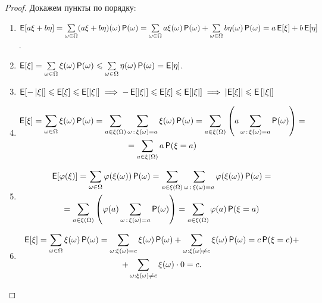 \begin{proof}
    Докажем пункты по порядку:
    \begin{enumerate}
        \item \(\operatorname{\mathsf{E}}[a\xi + b\eta] = \sum\limits_{\omega \in \Omega} (a\xi+b\eta)(\omega) \operatorname{\mathsf{P}}(\omega) =
        \sum\limits_{\omega \in \Omega} a\xi(\omega) \operatorname{\mathsf{P}}(\omega) + \sum\limits_{\omega \in \Omega}b\eta(\omega) \operatorname{\mathsf{P}}(\omega) = a\operatorname{\mathsf{E}}[\xi] + b\operatorname{\mathsf{E}}[\eta]\).
        \item \(\operatorname{\mathsf{E}}[\xi] = \sum\limits_{\omega \in \Omega} \xi(\omega)\operatorname{\mathsf{P}}(\omega) \leqslant \sum\limits_{\omega \in \Omega} \eta(\omega)\operatorname{\mathsf{P}}(\omega) = \operatorname{\mathsf{E}}[\eta]\).
        \item \(\operatorname{\mathsf{E}}[-\left|\xi\right|] \leqslant \operatorname{\mathsf{E}}[\xi] \leqslant \operatorname{\mathsf{E}}[\left|\xi\right|] \implies -\operatorname{\mathsf{E}}[\left|\xi\right|] \leqslant \operatorname{\mathsf{E}}[\xi] \leqslant \operatorname{\mathsf{E}}[\left|\xi\right|] \implies \left|\operatorname{\mathsf{E}}[\xi]\right| \leqslant \operatorname{\mathsf{E}}\left[|\xi\right|]\)
        \item
        \begin{multline*}
            \operatorname{\mathsf{E}}[\xi] =
            \sum\limits_{\omega \in \Omega} \xi(\omega)\operatorname{\mathsf{P}}(\omega) =
            \sum\limits_{a \in \xi(\Omega)}\sum\limits_{\omega\,:\,\xi(\omega) = a} \xi(\omega)\operatorname{\mathsf{P}}(\omega) =
            \sum\limits_{a \in \xi(\Omega)} \left(a\sum\limits_{\omega\,:\,\xi(\omega) = a} \operatorname{\mathsf{P}}(\omega)\right) = \\ =
            \sum\limits_{a \in \xi(\Omega)} a\operatorname{\mathsf{P}}(\xi = a)
        \end{multline*}
        \item 
        \begin{multline*}
        \operatorname{\mathsf{E}}[\varphi(\xi)] =
        \sum\limits_{\omega \in \Omega} \varphi(\xi(\omega))\operatorname{\mathsf{P}}(\omega) =
        \sum\limits_{a \in \xi(\Omega)}\sum\limits_{\omega\,:\,\xi(\omega) = a} \varphi(\xi(\omega))\operatorname{\mathsf{P}}(\omega) = \\ =
        \sum\limits_{a \in \xi(\Omega)} \left(\varphi(a)\sum\limits_{\omega\,:\,\xi(\omega) = a} \operatorname{\mathsf{P}}(\omega)\right) = 
        \sum\limits_{a \in \xi(\Omega)} \varphi(a)\operatorname{\mathsf{P}}(\xi = a)
        \end{multline*}
        
        \item
        \begin{multline*}
            \operatorname{\mathsf{E}}[\xi] = \sum\limits_{\omega \in \Omega} \xi(\omega)\operatorname{\mathsf{P}}(\omega) = \sum\limits_{\omega : \xi(\omega) = c} \xi(\omega)\operatorname{\mathsf{P}}(\omega) + \sum\limits_{\omega : \xi(\omega) \neq c} \xi(\omega)\operatorname{\mathsf{P}}(\omega) = c \operatorname{\mathsf{P}}(\xi = c) + \\ + \sum\limits_{\omega : \xi(\omega) \neq c}\xi(\omega)\cdot 0 = c.
        \end{multline*}
        

\end{enumerate}
\end{proof}
